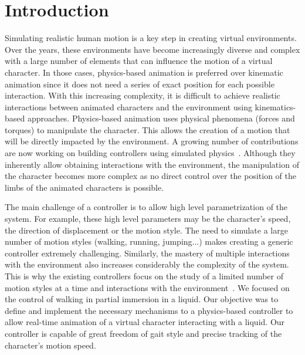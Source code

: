\documentclass[conference]{acmsiggraph}
\begin{document}
\begin{CRcatlist}
\end{CRcatlist}

\keywordlist


\section{Introduction}

Simulating realistic human motion is a key step in creating virtual environments. Over the years, these environments have become increasingly diverse and complex with a large number of elements that can influence the motion of a virtual character. In those cases, physics-based animation is preferred over kinematic animation since it does not need a series of exact position for each possible interaction. With this increasing complexity, it is difficult to achieve realistic interactions between animated characters and the environment using kinematics-based approaches. Physics-based animation uses physical phenomena (forces and torques) to manipulate the character. This allows the creation of a motion that will be directly impacted by the environment. A growing number of contributions are now working on building controllers using simulated physics~\cite{geijtenbeek2012interactive}. Although they inherently allow obtaining interactions with the environment, the manipulation of the character becomes more complex as no direct control over the position of the limbs of the animated characters is possible.

The main challenge of a controller is to allow high level parametrization of the system. For example, these high level parameters may be the character's speed, the direction of displacement or the motion style. The need to simulate a large number of motion styles (walking, running, jumping...) makes creating a generic controller extremely challenging. Similarly, the mastery of multiple interactions with the environment also increases considerably the complexity of the system. This is why the existing controllers focus on the study of a limited number of motion styles at a time and interactions with the environment~\cite{geijtenbeek2012interactive}. We focused on the control of walking in partial immersion in a liquid. Our objective was to define and implement the necessary mechanisms to a physics-based controller to allow real-time animation of a virtual character interacting with a liquid. Our controller is capable of great freedom of gait style and precise tracking of the character's motion speed.
\end{document}
